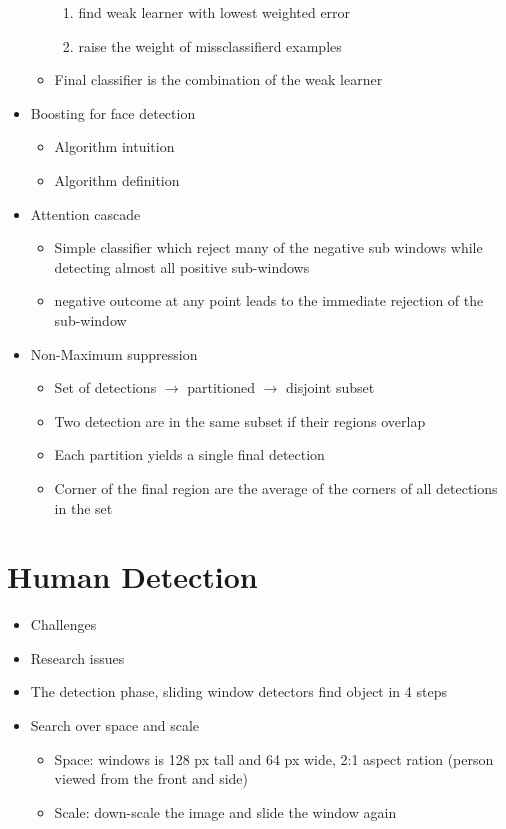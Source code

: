 \documentclass[12pt,oneside]{report}
\begin{document}
\begin{itemize}
\begin{itemize}
        \begin{enumerate}
            \item find weak learner with lowest weighted error
            \item raise the weight of missclassifierd examples
        \end{enumerate}
        \item Final classifier is the combination of the weak learner
    \end{itemize}
    \item Boosting for face detection
    \begin{itemize}
        \item Algorithm intuition
        \item Algorithm definition
    \end{itemize}
    \item Attention cascade
    \begin{itemize}
        \item Simple classifier which reject many of the negative sub windows while detecting almost all positive sub-windows
        \item negative outcome at any point leads to the immediate rejection of the sub-window
    \end{itemize}
    \item Non-Maximum suppression
    \begin{itemize}
        \item Set of detections \(\rightarrow\) partitioned \(\rightarrow\) disjoint subset
        \item Two detection are in the same subset if their regions overlap
        \item Each partition yields a single final detection
        \item Corner of the final region are the average of the corners of all detections in the set
    \end{itemize}
\end{itemize}


\chapter{Human Detection}
\begin{itemize}
    \item Challenges
    \item Research issues
    \item The detection phase, sliding window detectors find object in 4 steps
    \item Search over space and scale
    \begin{itemize}
        \item Space: windows is 128 px tall and 64 px wide, 2:1 aspect ration (person viewed from the front and side)
        \item Scale: down-scale the image and slide the window again
    \end{itemize}
\end{itemize}
\end{document}

